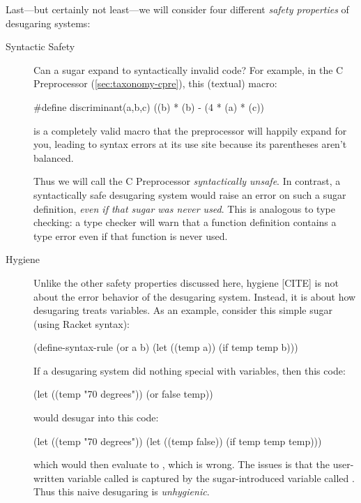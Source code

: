 Last---but certainly not least---we will consider four different
\emph{safety properties} of desugaring systems:
\begin{description}
  \item[Syntactic Safety] Can a sugar expand to syntactically invalid
    code? For example, in the C Preprocessor (\cref{sec:taxonomy-cpre}), this
    (textual) macro:
\begin{CorrectlyIndentedCodes}
#define discriminant(a,b,c) ((b) * (b) - (4 * (a) * (c))
\end{CorrectlyIndentedCodes}
    is a completely valid macro that the preprocessor will happily
    expand for you, leading to syntax errors at its use site because
    its parentheses aren't balanced.

    Thus we will call the C Preprocessor \emph{syntactically unsafe}.
    In contrast, a syntactically safe desugaring system would raise an
    error on such a sugar definition, \emph{even if that sugar was
      never used}. This is analogous to type checking: a type checker
    will warn that a function definition contains a type error even
    if that function is never used.
  \item[Hygiene] Unlike the other safety properties discussed here,
    hygiene [CITE] is not about the error behavior of the desugaring
    system.  Instead, it is about how desugaring treats variables. As
    an example, consider this simple  sugar (using Racket
    syntax):
\begin{CorrectlyIndentedCodes}
(define-syntax-rule
  (or a b)
  (let ((temp a)) (if temp temp b)))
\end{CorrectlyIndentedCodes}
    If a desugaring system did nothing special with variables, then
    this code:
\begin{CorrectlyIndentedCodes}
(let ((temp "70 degrees"))
  (or false temp))
\end{CorrectlyIndentedCodes}
    would desugar into this code:
\begin{CorrectlyIndentedCodes}
(let ((temp "70 degrees"))
  (let ((temp false)) (if temp temp temp)))
\end{CorrectlyIndentedCodes}
    which would then evaluate to , which is wrong. The
    issues is that the user-written variable called  is
    captured by the sugar-introduced variable called .
    Thus this naive desugaring is \emph{unhygienic}.
    

\end{description}
